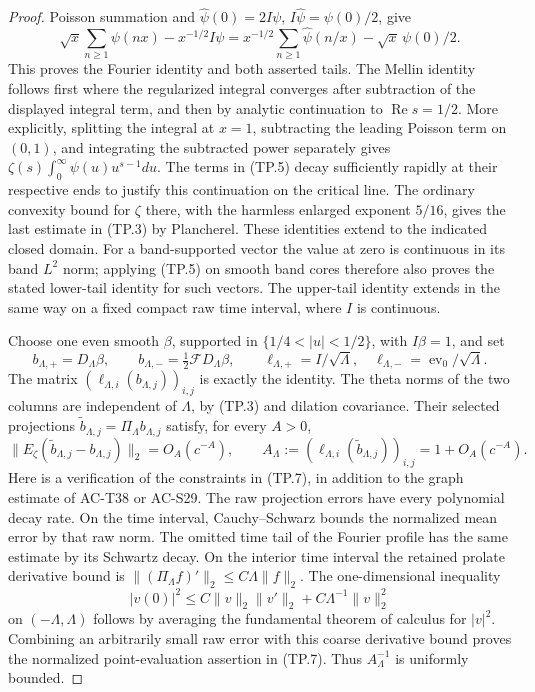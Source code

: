 \begin{proof}
Poisson summation and
\(\widehat\psi(0)=2I\psi\),
\(I\widehat\psi=\psi(0)/2\), give
\[
 \sqrt{x}\sum_{n\geq1}\psi(nx)-x^{-1/2}I\psi
 =x^{-1/2}\sum_{n\geq1}\widehat\psi(n/x)
                                      -\sqrt{x}\,\psi(0)/2.
 \tag{TP.5}
\]
This proves the Fourier identity and both asserted tails.
The Mellin identity follows first where the regularized
integral converges after subtraction of the displayed
integral term, and then by analytic continuation to
\(\operatorname{Re}s=1/2\).  More explicitly, splitting
the integral at \(x=1\), subtracting the leading Poisson
term on \((0,1)\), and integrating the subtracted power
separately gives
\(\zeta(s)\int_0^\infty\psi(u)u^{s-1}du\).
The terms in (TP.5) decay sufficiently rapidly at their
respective ends to justify this continuation on the
critical line.  The ordinary convexity bound for \(\zeta\)
there, with the harmless enlarged exponent \(5/16\), gives
the last estimate in (TP.3) by Plancherel.
These identities extend to the indicated closed domain.
For a band-supported vector the value at zero is continuous
in its band \(L^2\) norm; applying (TP.5) on smooth band
cores therefore also proves the stated lower-tail identity
for such vectors.  The upper-tail identity extends in the
same way on a fixed compact raw time interval, where \(I\)
is continuous.

Choose one even smooth \(\beta\), supported in
\(\{1/4<|u|<1/2\}\), with \(I\beta=1\), and set
\[
 b_{\Lambda,+}=D_\Lambda\beta,\qquad
 b_{\Lambda,-}=\tfrac12\mathcal F D_\Lambda\beta,\qquad
 \ell_{\Lambda,+}=I/\sqrt{\Lambda},\quad
 \ell_{\Lambda,-}=\operatorname{ev}_0/\sqrt{\Lambda}.
 \tag{TP.6}
\]
The matrix \((\ell_{\Lambda,i}(b_{\Lambda,j}))_{i,j}\)
is exactly the identity.  The theta norms of the two
columns are independent of \(\Lambda\), by (TP.3) and
dilation covariance.  Their selected projections
\(\widetilde b_{\Lambda,j}=\Pi_\Lambda b_{\Lambda,j}\)
satisfy, for every \(A>0\),
\[
 \|E_\zeta(\widetilde b_{\Lambda,j}-b_{\Lambda,j})\|_2
     =O_A(c^{-A}),\qquad
 A_\Lambda:=(\ell_{\Lambda,i}
                   (\widetilde b_{\Lambda,j}))_{i,j}
                         =1+O_A(c^{-A}).
 \tag{TP.7}
\]
Here is a verification of the constraints in (TP.7),
in addition to the graph estimate of AC-T38 or AC-S29.
The raw projection errors have every polynomial decay
rate.  On the time interval, Cauchy--Schwarz bounds the
normalized mean error by that raw norm.  The omitted
time tail of the Fourier profile has the same estimate
by its Schwartz decay.  On the interior time interval
the retained prolate derivative bound is
\(\|(\Pi_\Lambda f)'\|_2\leq C\Lambda\|f\|_2\).
The one-dimensional inequality
\[
 |v(0)|^2\leq C\|v\|_2\|v'\|_2+
                          C\Lambda^{-1}\|v\|_2^2
 \tag{TP.8}
\]
on \((-\Lambda,\Lambda)\) follows by averaging the
fundamental theorem of calculus for \(|v|^2\).
Combining an arbitrarily small raw error with this
coarse derivative bound proves the normalized
point-evaluation assertion in (TP.7).
Thus \(A_\Lambda^{-1}\) is uniformly bounded.


\end{proof}

